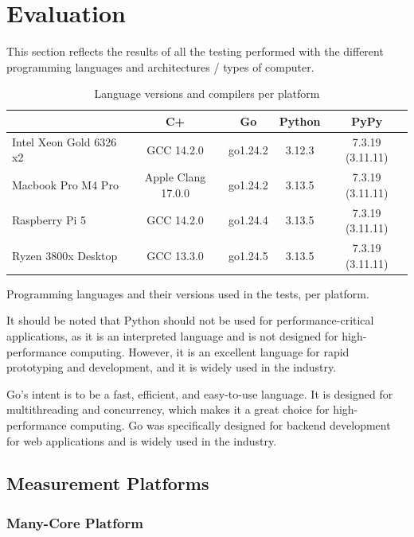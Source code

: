 \chapter{Evaluation}\label{chap:evaluation}

This section reflects the results of all the testing performed with the different programming languages and architectures / types of computer.

\begin{table}[ht]
  \centering
  \begin{tabular}{lcccc}
    \toprule
                            & C\++                  & Go        & Python & PyPy \\
    \midrule
    Intel Xeon Gold 6326 x2 &  GCC 14.2.0           & go1.24.2  & 3.12.3 & 7.3.19 (3.11.11) \\
    Macbook Pro M4 Pro      &  Apple Clang 17.0.0   & go1.24.2  & 3.13.5 & 7.3.19 (3.11.11) \\
    Raspberry Pi 5          &  GCC 14.2.0           & go1.24.4  & 3.13.5 & 7.3.19 (3.11.11) \\
    Ryzen 3800x Desktop     &  GCC 13.3.0           & go1.24.5  & 3.13.5 & 7.3.19 (3.11.11) \\
    \bottomrule
  \end{tabular}
  \caption{Language versions and compilers per platform}{Programming languages and their versions used in the tests, per platform.}
  \label{tab:lang-platforms}
\end{table}

It should be noted that Python should not be used for performance-critical applications, as it is an interpreted language and is not designed for high-performance computing. However, it is an excellent language for rapid prototyping and development, and it is widely used in the industry.

Go's intent is to be a fast, efficient, and easy-to-use language. It is designed for multithreading and concurrency, which makes it a great choice for high-performance computing. Go was specifically designed for backend development for web applications and is widely used in the industry.

\section{Measurement Platforms}

\subsection{Many-Core Platform}

